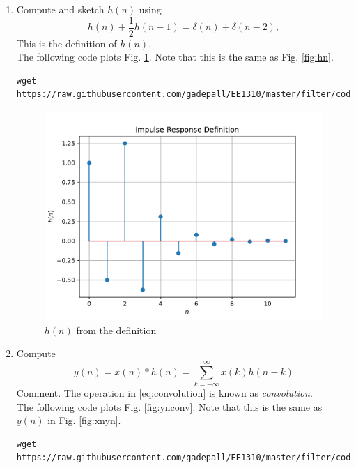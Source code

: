 \documentclass[journal,12pt,twocolumn]{IEEEtran}
\renewcommand\thesection{\arabic{section}}
\begin{document}
\begin{enumerate}[label=\thesection.\arabic*]
\item 
Compute and sketch $h(n)$ using 
\begin{equation}
\label{eq:iir_filter_h}
h(n) + \frac{1}{2}h(n-1) = \delta(n) + \delta(n-2), 
\end{equation}
%
This is the definition of $h(n)$.
\\
\solution The following code plots Fig. \ref{fig:hndef}. Note that this is the same as Fig. 
\ref{fig:hn}. 
%
\begin{lstlisting}
wget https://raw.githubusercontent.com/gadepall/EE1310/master/filter/codes/hndef.py
\end{lstlisting}
\begin{figure}[!ht]
\centering
\includegraphics[width=\columnwidth]{./figs/hndef}
\caption{$h(n)$ from the definition}
\label{fig:hndef}
\end{figure}
%
\item Compute 
%
\begin{equation}
\label{eq:convolution}
y(n) = x(n)*h(n) = \sum_{k=-\infty}^{\infty}x(k)h(n-k)
\end{equation}
%
Comment. The operation in \eqref{eq:convolution} is known as
{\em convolution}.
%
\\
\solution The following code plots Fig. \ref{fig:ynconv}. Note that this is the same as 
$y(n)$ in  Fig. 
\ref{fig:xnyn}. 
%
\begin{lstlisting}
wget https://raw.githubusercontent.com/gadepall/EE1310/master/filter/codes/ynconv.py
\end{lstlisting}
\begin{figure}[!ht]
\centering

\end{figure}
\end{enumerate}
\end{document}
